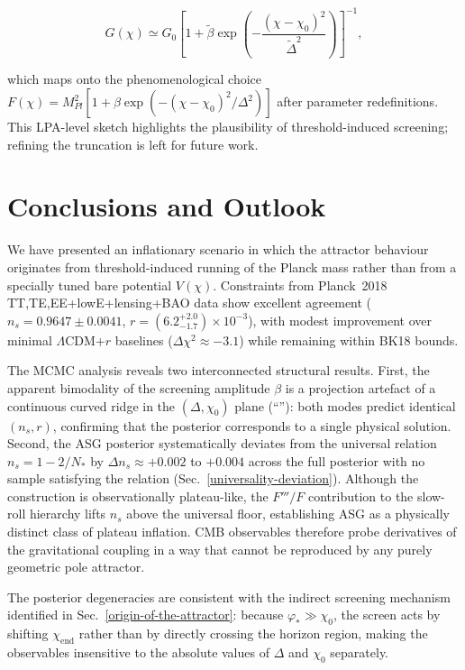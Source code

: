 \documentclass[
]{article}
\begin{document}
\[
G(\chi) \simeq G_{0}\left\lbrack 1 + \widetilde{\beta}\exp\left( - \frac{(\chi - \chi_{0})^{2}}{{\widetilde{\Delta}}^{2}} \right) \right\rbrack^{- 1},
\]

which maps onto the phenomenological choice
\(F(\chi) = M_{Pl}^{2}\left\lbrack 1 + \beta\exp( - (\chi - \chi_{0})^{2}/\Delta^{2}) \right\rbrack\)
after parameter redefinitions. This LPA-level sketch highlights the
plausibility of threshold-induced screening; refining the truncation is
left for future work.

\section{Conclusions and Outlook}\label{conclusions-and-outlook}

We have presented an inflationary scenario in which the attractor
behaviour originates from threshold-induced running of the Planck mass
rather than from a specially tuned bare potential \(V(\chi)\).
Constraints from Planck~2018 TT,TE,EE+lowE+lensing+BAO data show
excellent agreement (\(n_{s} = 0.9647 \pm 0.0041\),
\(r = ({6.2}_{-1.7}^{+2.0}) \times 10^{-3}\)), with modest improvement
over minimal \(\Lambda\)CDM+\(r\) baselines
(\(\Delta\chi^{2} \approx -3.1\)) while remaining within BK18 bounds.

The MCMC analysis reveals two interconnected structural results.
First, the apparent bimodality of the screening amplitude \(\beta\)
is a projection artefact of a continuous curved ridge in the
\((\Delta,\chi_{0})\) plane (``''): both modes
predict identical \((n_{s},r)\), confirming that the posterior
corresponds to a single physical solution.
Second, the ASG posterior systematically deviates from the universal
relation \(n_{s} = 1 - 2/N_{*}\) by \(\Delta n_{s} \approx +0.002\)
to \(+0.004\) across the full posterior with no sample satisfying the
relation (Sec.~\ref{universality-deviation}). Although the construction
is observationally plateau-like, the \(F'''/F\) contribution to the
slow-roll hierarchy lifts \(n_{s}\) above the universal floor,
establishing ASG as a physically distinct class of plateau inflation.
CMB observables therefore probe derivatives of the gravitational
coupling in a way that cannot be reproduced by any purely geometric
pole attractor.

The posterior degeneracies are consistent with the indirect screening
mechanism identified in Sec.~\ref{origin-of-the-attractor}: because
\(\varphi_{*} \gg \chi_{0}\), the screen acts by shifting
\(\chi_{\mathrm{end}}\) rather than by directly crossing the horizon
region, making the observables insensitive to the absolute values of
\(\Delta\) and \(\chi_{0}\) separately.
\end{document}
